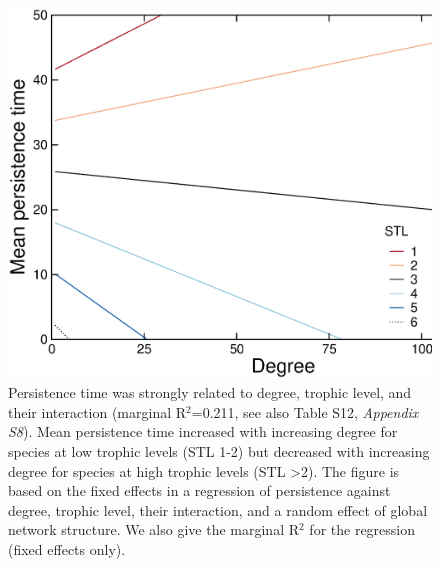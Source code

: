 \documentclass[12pt]{article}
\begin{document}
    \begin{figure}[ht!]
        \centering
        \includegraphics[width=\textwidth]{figures/roles/persistence_vs_degTL.eps}
        \caption{Persistence time was strongly related to degree, trophic level, and their interaction (marginal R$^2$=0.211, see also Table S12, \emph{Appendix S8}). Mean persistence time increased with increasing degree for species at low trophic levels (STL 1-2) but decreased with increasing degree for species at high trophic levels (STL \textgreater2). The figure is based on the fixed effects in a regression of persistence against degree, trophic level, their interaction, and a random effect of global network structure. We also give the marginal R$^2$ for the regression (fixed effects only).}
        \label{fig:persistence_degTL}
    \end{figure}

\clearpage




    
\end{document}
